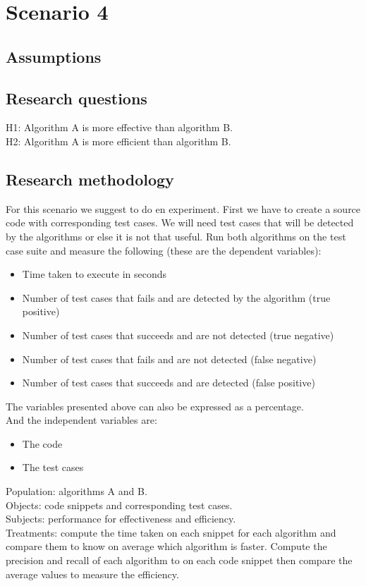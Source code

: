 \documentclass{article}
\begin{document}
\section{Scenario 4}
\subsection{Assumptions}

\subsection{Research questions}
H1: Algorithm A is more effective than algorithm B. \\
H2: Algorithm A is more efficient than algorithm B.

\subsection{Research methodology}
For this scenario we suggest to do en experiment. First we have to create a source code with corresponding test cases. We will need test cases that will be detected by the algorithms or else it is not that useful. Run both algorithms on the test case suite and measure the following (these are the dependent variables):
\begin{itemize}
    \item Time taken to execute in seconds
    \item Number of test cases that fails and are detected by the algorithm (true positive)
    \item Number of test cases that succeeds and are not detected (true negative)
    \item Number of test cases that fails and are not detected (false negative)
    \item Number of test cases that succeeds and are detected (false positive)
\end{itemize}
The variables presented above can also be expressed as a percentage. \\
And the independent variables are:
\begin{itemize}
    \item The code
    \item The test cases
\end{itemize}
Population: algorithms A and B. \\
Objects: code snippets and corresponding test cases. \\
Subjects: performance for effectiveness and efficiency. \\
Treatments: compute the time taken on each snippet for each algorithm and compare them to know on average which algorithm is faster. Compute the precision and recall of each algorithm to on each code snippet then compare the average values to measure the efficiency.
\end{document}
